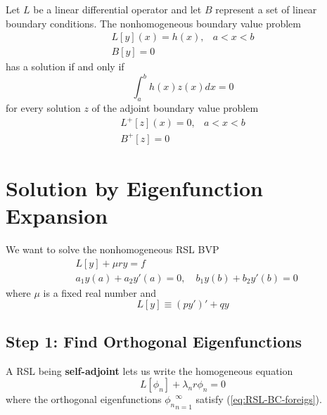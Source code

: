 \begin{theorem}\label{th:Fredholm-Alt}
    Let $L$ be a linear differential operator and let $B$ represent a set of linear boundary conditions. The nonhomogeneous boundary value problem
    \begin{equation}
        \begin{array}{lr}
             L[y](x)=h(x), & a<x<b \\
             B[y] = 0 & 
        \end{array}
    \end{equation}
    has a solution if and only if
    \begin{equation}
        \int_a^b h(x)z(x)dx = 0 
    \end{equation}
    for every solution $z$ of the adjoint boundary value problem
    \begin{equation}
        \begin{array}{lr}
             L^+[z](x)=0, & a<x<b \\
             B^+[z] = 0 & 
        \end{array}
    \end{equation}
\end{theorem}



\section{Solution by Eigenfunction Expansion}
We want to solve the nonhomogeneous RSL BVP
\begin{align} 
    & L[y] + \mu r y = f \label{eq:RSL-operator-foreigs} \\
    & a_1 y(a) + a_2 y'(a) = 0, \quad b_1y(b)+b_2y'(b)=0 \label{eq:RSL-BC-foreigs}
\end{align}
where $\mu$ is a fixed real number and 
\begin{equation} \label{eq:RSL-operator-eig}
    L[y] \equiv (py')' + qy
\end{equation}

\subsection*{Step 1: Find Orthogonal Eigenfunctions}
A RSL being \textbf{self-adjoint} lets us write the homogeneous equation
\begin{equation}\label{eq:selfadjoint-homo-RSL}
    L[\phi_n] + \lambda_n r \phi_n = 0
\end{equation}
where the orthogonal eigenfunctions ${\phi_n}_{n=1}^\infty$ satisfy (\ref{eq:RSL-BC-foreigs}).

